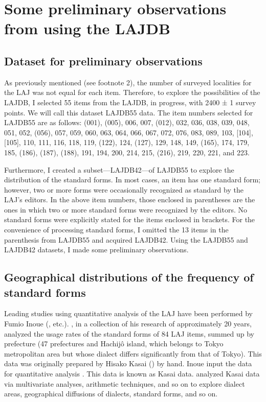 \documentclass[output=paper]{LSP/langsci}
\begin{document}
\section{Some preliminary observations from using the LAJDB}

\subsection{Dataset for preliminary observations}
As previously mentioned (see footnote 2), the number of surveyed localities for the LAJ was not equal for each item. Therefore, to explore the possibilities of the LAJDB, I selected 55 items from the LAJDB, in progress, with 2400 ± 1 survey points. We will call this dataset LAJDB55 data. The item numbers selected for LAJDB55 are as follows: (001), (005), 006, 007, (012), 032, 036, 038, 039, 048, 051, 052, (056), 057, 059, 060, 063, 064, 066, 067, 072, 076, 083, 089, 103, [104], [105], 110, 111, 116, 118, 119, (122), 124, (127), 129, 148, 149, (165), 174, 179, 185, (186), (187), (188), 191, 194, 200, 214, 215, (216), 219, 220, 221, and 223. 

Furthermore, I created a subset—LAJDB42—of LAJDB55 to explore the distribution of the standard forms. In most cases, an item has one standard form; however, two or more forms were occasionally recognized as standard by the LAJ’s editors. In the above item numbers, those enclosed in parentheses are the ones in which two or more standard forms were recognized by the editors. No standard forms were explicitly stated for the items enclosed in brackets. For the convenience of processing standard forms, I omitted the 13 items in the parenthesis from LAJDB55 and acquired LAJDB42. Using the LAJDB55 and LAJDB42 datasets, I made some preliminary observations.

\subsection{Geographical distributions of the frequency of standard forms}
Leading studies using quantitative analysis of the LAJ have been performed by Fumio Inoue (\citealt{inoue_keiryoteki_2001}, etc.). \citet{inoue_keiryoteki_2001}, in a collection of his research of approximately 20 years, analyzed the usage rates of the standard forms of 84 LAJ items, summed up by prefecture (47 prefectures and Hachijô island, which belongs to Tokyo metropolitan area but whose dialect differs significantly from that of Tokyo). This data was originally prepared by Hisako Kasai (\citeyear{kasai_hyojun_1981}) by hand. Inoue input the data for quantitative analysis \citep[89]{inoue_keiryoteki_2001}. This data is known as Kasai data. \citet{inoue_keiryoteki_2001} analyzed Kasai data via multivariate analyses, arithmetic techniques, and so on to explore dialect areas, geographical diffusions of dialects, standard forms, and so on.
\end{document}
